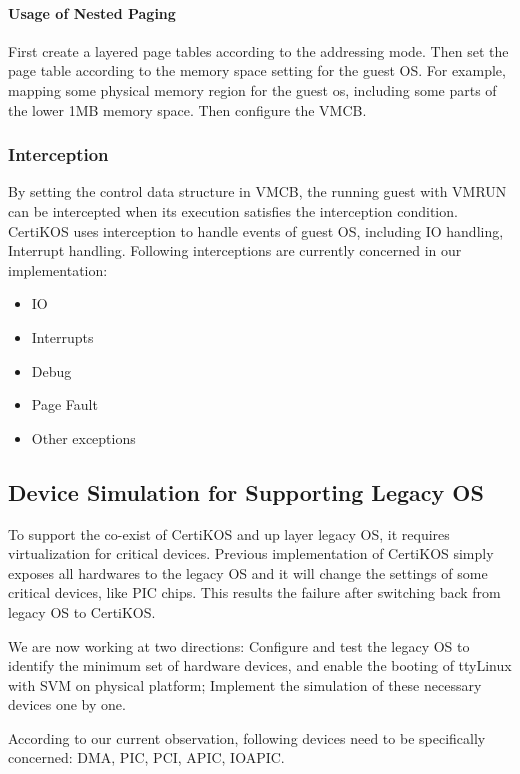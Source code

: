 \documentclass[a4paper,12pt]{article}
\begin{document}
\paragraph{Usage of Nested Paging}

First create a  layered page tables according to the addressing mode.  Then set the page table according to the memory space setting for the guest OS.  For example, mapping some physical memory region for the guest os, including some parts of the lower 1MB memory space.  Then configure the VMCB.

\subsubsection{Interception}
By setting the control data structure in VMCB, the running guest with VMRUN can be intercepted when its execution satisfies the interception condition.  CertiKOS uses interception to handle events of guest OS, including IO handling, Interrupt handling. Following interceptions are currently concerned in our implementation:
\begin{itemize}
\item IO
\item Interrupts
\item Debug
\item Page Fault
\item  Other exceptions

\end{itemize}


\subsection{Device Simulation for Supporting Legacy OS }
To support the co-exist of CertiKOS and up layer legacy OS, it requires virtualization for critical devices.  Previous implementation of CertiKOS simply exposes all hardwares to the legacy OS and it will change the settings of some critical devices, like PIC chips. This results the failure after switching back from legacy OS to CertiKOS.

We are now working at two directions:  Configure and test the legacy OS to identify the minimum  set of hardware devices, and enable the booting of ttyLinux with SVM on physical platform; Implement the simulation of these necessary devices one by one.

According to our current observation, following devices need to be specifically concerned: DMA, PIC, PCI, APIC, IOAPIC.
\end{document}
